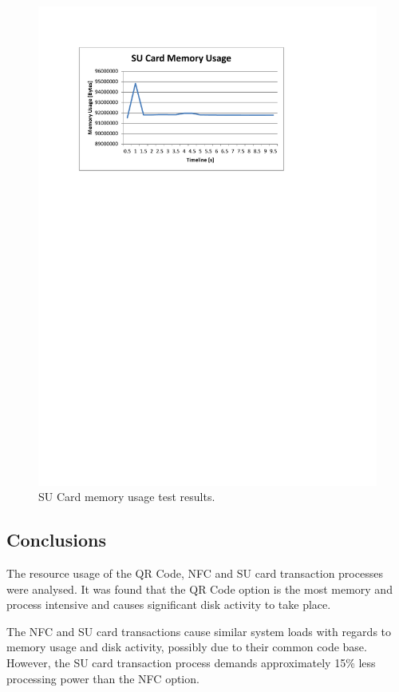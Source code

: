 \begin{figure}
 \centering 
 \includegraphics[clip=true, trim = 0 550 80 70,
 scale=0.7]{su_test_mem}
 \caption{SU Card memory usage test results.}
 \label{fig:su_test_mem}
\end{figure}

\subsection{Conclusions}

The resource usage of the QR Code, NFC and SU card transaction processes were analysed. It
was found that the QR Code option is the most memory and process intensive and causes
significant disk activity to take place. 

The NFC and SU card transactions cause similar system loads with regards to memory usage
and disk activity, possibly due to their common code base. However, the SU card
transaction process demands approximately 15\% less processing power than the NFC option. 

